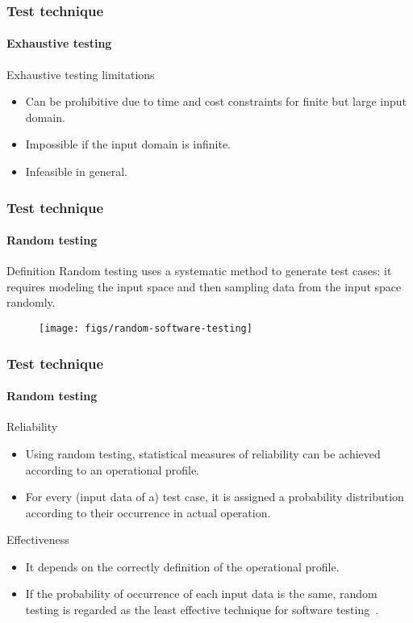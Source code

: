 \begin{frame}
\frametitle{Test technique}
\framesubtitle{Exhaustive testing}

\begin{block:fact}{Exhaustive testing limitations}
\begin{itemize}
	\item Can be prohibitive due to time and cost constraints for finite
	but large input domain.

	\item Impossible if the input domain is infinite.

	\item Infeasible in general.
\end{itemize}
\end{block:fact}
\end{frame}



\begin{frame}
\frametitle{Test technique}
\framesubtitle{Random testing}
\label{concept:random-testing}

\begin{block:concept}{Definition}
Random testing uses a systematic method to generate test cases: it
requires modeling the input space and then sampling data from the input
space randomly.
\end{block:concept}

\begin{figure}
    \centering
    \texttt{[image: figs/random-software-testing]}
\end{figure}
\end{frame}


\begin{frame}
\frametitle{Test technique}
\framesubtitle{Random testing}

\begin{block:concept}{Reliability}
\begin{itemize}
	\item Using random testing, statistical measures of reliability can be
	achieved according to an operational profile.

	\item For every (input data of a) test case, it is assigned a probability
	distribution according to their occurrence in actual operation.
\end{itemize}
\end{block:concept}

\begin{block:fact}{Effectiveness}
\begin{itemize}
	\item It depends on the correctly definition of the operational profile.

	\item If the probability of occurrence of each input data is the same,
	random testing is regarded as the least effective technique for software
	testing~\cite[p. 43]{myers:2004}.
\end{itemize}

\end{block:fact}


\end{frame}


